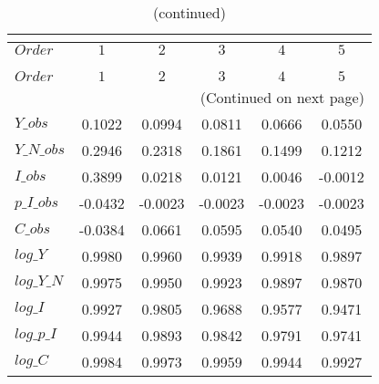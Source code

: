  
\begin{center}
\begin{longtable}{lccccc} 
\caption{COEFFICIENTS OF AUTOCORRELATION}\\
 \label{Table:th_autocorr_matrix}\\
\toprule 
$Order      $	 & 	 $          1$	 & 	 $          2$	 & 	 $          3$	 & 	 $          4$	 & 	 $          5$\\
\midrule \endfirsthead 
\caption{(continued)}\\
 \toprule \\ 
$Order      $	 & 	 $          1$	 & 	 $          2$	 & 	 $          3$	 & 	 $          4$	 & 	 $          5$\\
\midrule \endhead 
\midrule \multicolumn{6}{r}{(Continued on next page)} \\ \bottomrule \endfoot 
\bottomrule \endlastfoot 
$Y\_obs     $	 & 	     0.1022	 & 	     0.0994	 & 	     0.0811	 & 	     0.0666	 & 	     0.0550 \\ 
$Y\_N\_obs  $	 & 	     0.2946	 & 	     0.2318	 & 	     0.1861	 & 	     0.1499	 & 	     0.1212 \\ 
$I\_obs     $	 & 	     0.3899	 & 	     0.0218	 & 	     0.0121	 & 	     0.0046	 & 	    -0.0012 \\ 
$p\_I\_obs  $	 & 	    -0.0432	 & 	    -0.0023	 & 	    -0.0023	 & 	    -0.0023	 & 	    -0.0023 \\ 
$C\_obs     $	 & 	    -0.0384	 & 	     0.0661	 & 	     0.0595	 & 	     0.0540	 & 	     0.0495 \\ 
$log\_Y     $	 & 	     0.9980	 & 	     0.9960	 & 	     0.9939	 & 	     0.9918	 & 	     0.9897 \\ 
$log\_Y\_N  $	 & 	     0.9975	 & 	     0.9950	 & 	     0.9923	 & 	     0.9897	 & 	     0.9870 \\ 
$log\_I     $	 & 	     0.9927	 & 	     0.9805	 & 	     0.9688	 & 	     0.9577	 & 	     0.9471 \\ 
$log\_p\_I  $	 & 	     0.9944	 & 	     0.9893	 & 	     0.9842	 & 	     0.9791	 & 	     0.9741 \\ 
$log\_C     $	 & 	     0.9984	 & 	     0.9973	 & 	     0.9959	 & 	     0.9944	 & 	     0.9927 \\ 
\end{longtable}
 \end{center}
